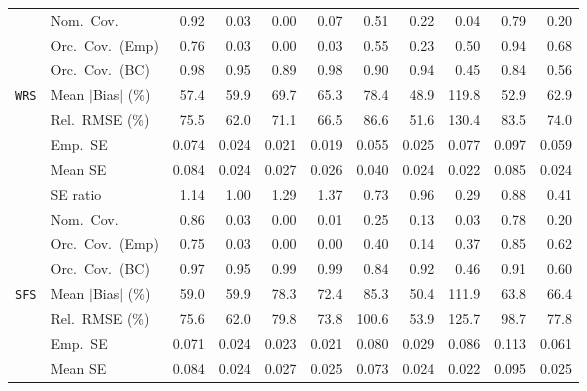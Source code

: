 \begin{landscape}
\begin{longtable}{llrrrrrrrrr}
 & Nom.\ Cov. & \cellcolor{rankone}0.92 & 0.03 & 0.00 & 0.07 & \cellcolor{rankthree}0.51 & 0.22 & 0.04 & \cellcolor{ranktwo}0.79 & 0.20 \\
 & Orc.\ Cov.\ (Emp) & \cellcolor{ranktwo}0.76 & 0.03 & 0.00 & 0.03 & 0.55 & 0.23 & 0.50 & \cellcolor{rankone}0.94 & \cellcolor{rankthree}0.68 \\
 & Orc.\ Cov.\ (BC) & \cellcolor{rankthree}0.98 & \cellcolor{rankone}0.95 & 0.89 & \cellcolor{rankthree}0.98 & 0.90 & \cellcolor{ranktwo}0.94 & 0.45 & 0.84 & 0.56 \\
\addlinespace[2pt]
\quad \texttt{WRS} & Mean $|$Bias$|$ (\%) & \cellcolor{rankthree}57.4 & 59.9 & 69.7 & 65.3 & 78.4 & \cellcolor{rankone}48.9 & 119.8 & \cellcolor{ranktwo}52.9 & 62.9 \\
 & Rel.\ RMSE (\%) & 75.5 & \cellcolor{ranktwo}62.0 & 71.1 & \cellcolor{rankthree}66.5 & 86.6 & \cellcolor{rankone}51.6 & 130.4 & 83.5 & 74.0 \\
 & Emp.\ SE & 0.074 & 0.024 & 0.021 & 0.019 & 0.055 & 0.025 & 0.077 & 0.097 & 0.059 \\
 & Mean SE & 0.084 & 0.024 & 0.027 & 0.026 & 0.040 & 0.024 & 0.022 & 0.085 & 0.024 \\
 & SE ratio & 1.14 & \cellcolor{rankone}1.00 & 1.29 & 1.37 & 0.73 & \cellcolor{ranktwo}0.96 & 0.29 & \cellcolor{rankthree}0.88 & 0.41 \\
 & Nom.\ Cov. & \cellcolor{rankone}0.86 & 0.03 & 0.00 & 0.01 & \cellcolor{rankthree}0.25 & 0.13 & 0.03 & \cellcolor{ranktwo}0.78 & 0.20 \\
 & Orc.\ Cov.\ (Emp) & \cellcolor{ranktwo}0.75 & 0.03 & 0.00 & 0.00 & 0.40 & 0.14 & 0.37 & \cellcolor{rankone}0.85 & \cellcolor{rankthree}0.62 \\
 & Orc.\ Cov.\ (BC) & \cellcolor{ranktwo}0.97 & \cellcolor{rankone}0.95 & 0.99 & 0.99 & 0.84 & \cellcolor{rankthree}0.92 & 0.46 & 0.91 & 0.60 \\
\addlinespace[2pt]
\quad \texttt{SFS} & Mean $|$Bias$|$ (\%) & \cellcolor{ranktwo}59.0 & \cellcolor{rankthree}59.9 & 78.3 & 72.4 & 85.3 & \cellcolor{rankone}50.4 & 111.9 & 63.8 & 66.4 \\
 & Rel.\ RMSE (\%) & 75.6 & \cellcolor{ranktwo}62.0 & 79.8 & \cellcolor{rankthree}73.8 & 100.6 & \cellcolor{rankone}53.9 & 125.7 & 98.7 & 77.8 \\
 & Emp.\ SE & 0.071 & 0.024 & 0.023 & 0.021 & 0.080 & 0.029 & 0.086 & 0.113 & 0.061 \\
 & Mean SE & 0.084 & 0.024 & 0.027 & 0.025 & 0.073 & 0.024 & 0.022 & 0.095 & 0.025 \\

\end{longtable}
\end{landscape}
